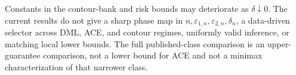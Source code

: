 Constants in the contour-bank and risk bounds may deteriorate as \(\delta\downarrow0\). The current results do not give a sharp phase map in \(n,\varepsilon_{1,n},\varepsilon_{2,n},\delta_n\), a data-driven selector across DML, ACE, and contour regimes, uniformly valid inference, or matching local lower bounds. The full published-class comparison is an upper-guarantee comparison, not a lower bound for ACE and not a minimax characterization of that narrower class.